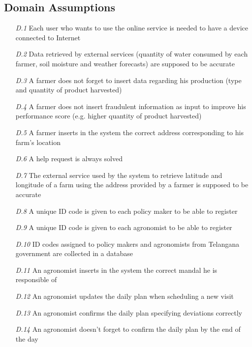 \subsection{Domain Assumptions}

\begin{itemize}
    \item [\textit{D.1}] Each user who wants to use the online service is needed to have a device connected to Internet 
    \item [\textit{D.2}] Data retrieved by external services (quantity of water consumed by each farmer, soil moisture and weather forecasts) are supposed to be accurate 
    \item [\textit{D.3}] A farmer does not forget to insert data regarding his production (type and quantity of product harvested)
    \item [\textit{D.4}] A farmer does not insert fraudulent information as input to  improve his performance score (e.g. higher quantity of product harvested)
    \item [\textit{D.5}] A farmer inserts in the system the correct address
    corresponding to his farm's location
    \item [\textit{D.6}] A help request is always solved
    \item [\textit{D.7}]The external service used by the system to retrieve latitude and longitude of a farm using the address provided by a farmer is supposed to be accurate
    \item [\textit{D.8}] A unique ID code is given to each policy maker to be able to register
    \item [\textit{D.9}] A unique ID code is given to each agronomist to be able to register
    \item [\textit{D.10}] ID codes assigned to policy makers and agronomists from Telangana government are collected in a database
    \item [\textit{D.11}] An agronomist inserts in the system the correct mandal he is responsible of
    \item [\textit{D.12}] An agronomist updates the daily plan when scheduling a new visit
    \item [\textit{D.13}] An agronomist confirms the daily plan specifying deviations correctly 
    \item [\textit{D.14}] An agronomist doesn't forget to confirm the daily plan by the end of the day
\end{itemize}

